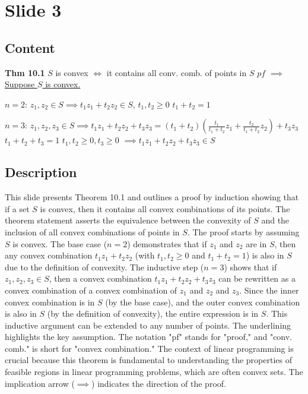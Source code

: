 \documentclass{article}%
\begin{document}
%
\newpage%
\section{Slide 3}%
\label{sec:Slide3}%
\subsection{Content}%

\textbf{Thm 10.1} \quad $S$ is convex $\iff$
it contains all conv. comb. of points in $S$
$pf$ $\implies$ \underline{Suppose $S$ is convex.}

$n=2$: $z_1, z_2 \in S \implies t_1 z_1 + t_2 z_2 \in S$, $t_1, t_2 \ge 0$
$t_1 + t_2 = 1$

$n=3$: $z_1, z_2, z_3 \in S \implies t_1 z_1 + t_2 z_2 + t_3 z_3 = (t_1 + t_2) \left( \frac{t_1}{t_1 + t_2} z_1 + \frac{t_2}{t_1 + t_2} z_2 \right) + t_3 z_3$
$t_1 + t_2 + t_3 = 1$
$t_1, t_2 \ge 0, t_3 \ge 0$
$\implies t_1 z_1 + t_2 z_2 + t_3 z_3 \in S$
%
\subsection{Description}%
This slide presents Theorem 10.1 and outlines a proof by induction showing that if a set $S$ is convex, then it contains all convex combinations of its points. The theorem statement asserts the equivalence between the convexity of $S$ and the inclusion of all convex combinations of points in $S$. The proof starts by assuming $S$ is convex. The base case ($n=2$) demonstrates that if $z_1$ and $z_2$ are in $S$, then any convex combination $t_1z_1 + t_2z_2$ (with $t_1, t_2 \ge 0$ and $t_1 + t_2 = 1$) is also in $S$ due to the definition of convexity. The inductive step ($n=3$) shows that if $z_1, z_2, z_3 \in S$, then a convex combination $t_1z_1 + t_2z_2 + t_3z_3$ can be rewritten as a convex combination of a convex combination of $z_1$ and $z_2$ and $z_3$.  Since the inner convex combination is in $S$ (by the base case), and the outer convex combination is also in $S$ (by the definition of convexity), the entire expression is in $S$. This inductive argument can be extended to any number of points.  The underlining highlights the key assumption. The notation "pf" stands for "proof," and "conv. comb." is short for "convex combination." The context of linear programming is crucial because this theorem is fundamental to understanding the properties of feasible regions in linear programming problems, which are often convex sets.  The implication arrow ($\implies$) indicates the direction of the proof.%
\end{document}
